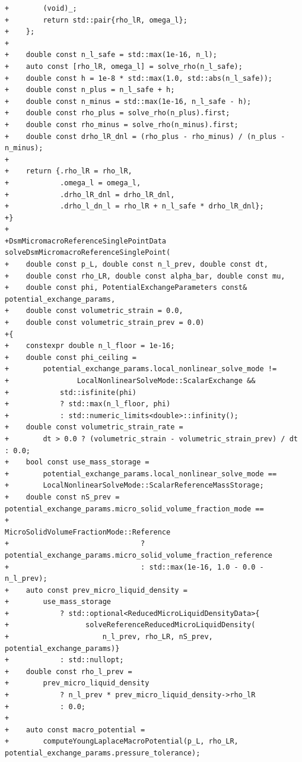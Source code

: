 \documentclass[10pt]{article}
\begin{document}
\begin{lstlisting}
+        (void)_;
+        return std::pair{rho_lR, omega_l};
+    };
+
+    double const n_l_safe = std::max(1e-16, n_l);
+    auto const [rho_lR, omega_l] = solve_rho(n_l_safe);
+    double const h = 1e-8 * std::max(1.0, std::abs(n_l_safe));
+    double const n_plus = n_l_safe + h;
+    double const n_minus = std::max(1e-16, n_l_safe - h);
+    double const rho_plus = solve_rho(n_plus).first;
+    double const rho_minus = solve_rho(n_minus).first;
+    double const drho_lR_dnl = (rho_plus - rho_minus) / (n_plus - n_minus);
+
+    return {.rho_lR = rho_lR,
+            .omega_l = omega_l,
+            .drho_lR_dnl = drho_lR_dnl,
+            .drho_l_dn_l = rho_lR + n_l_safe * drho_lR_dnl};
+}
+
+DsmMicromacroReferenceSinglePointData solveDsmMicromacroReferenceSinglePoint(
+    double const p_L, double const n_l_prev, double const dt,
+    double const rho_LR, double const alpha_bar, double const mu,
+    double const phi, PotentialExchangeParameters const& potential_exchange_params,
+    double const volumetric_strain = 0.0,
+    double const volumetric_strain_prev = 0.0)
+{
+    constexpr double n_l_floor = 1e-16;
+    double const phi_ceiling =
+        potential_exchange_params.local_nonlinear_solve_mode !=
+                LocalNonlinearSolveMode::ScalarExchange &&
+            std::isfinite(phi)
+            ? std::max(n_l_floor, phi)
+            : std::numeric_limits<double>::infinity();
+    double const volumetric_strain_rate =
+        dt > 0.0 ? (volumetric_strain - volumetric_strain_prev) / dt : 0.0;
+    bool const use_mass_storage =
+        potential_exchange_params.local_nonlinear_solve_mode ==
+        LocalNonlinearSolveMode::ScalarReferenceMassStorage;
+    double const nS_prev = potential_exchange_params.micro_solid_volume_fraction_mode ==
+                                   MicroSolidVolumeFractionMode::Reference
+                               ? potential_exchange_params.micro_solid_volume_fraction_reference
+                               : std::max(1e-16, 1.0 - 0.0 - n_l_prev);
+    auto const prev_micro_liquid_density =
+        use_mass_storage
+            ? std::optional<ReducedMicroLiquidDensityData>{
+                  solveReferenceReducedMicroLiquidDensity(
+                      n_l_prev, rho_LR, nS_prev, potential_exchange_params)}
+            : std::nullopt;
+    double const rho_l_prev =
+        prev_micro_liquid_density
+            ? n_l_prev * prev_micro_liquid_density->rho_lR
+            : 0.0;
+
+    auto const macro_potential =
+        computeYoungLaplaceMacroPotential(p_L, rho_LR, potential_exchange_params.pressure_tolerance);

\end{lstlisting}
\end{document}
